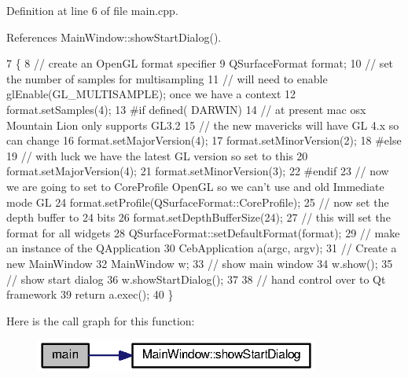 Definition at line 6 of file main.\-cpp.



References Main\-Window\-::show\-Start\-Dialog().


\begin{DoxyCode}
7 \{
8   \textcolor{comment}{// create an OpenGL format specifier}
9   QSurfaceFormat format;
10   \textcolor{comment}{// set the number of samples for multisampling}
11   \textcolor{comment}{// will need to enable glEnable(GL\_MULTISAMPLE); once we have a context}
12   format.setSamples(4);
13 \textcolor{preprocessor}{  #if defined( DARWIN)}
14 \textcolor{preprocessor}{}    \textcolor{comment}{// at present mac osx Mountain Lion only supports GL3.2}
15     \textcolor{comment}{// the new mavericks will have GL 4.x so can change}
16     format.setMajorVersion(4);
17     format.setMinorVersion(2);
18 \textcolor{preprocessor}{  #else}
19 \textcolor{preprocessor}{}    \textcolor{comment}{// with luck we have the latest GL version so set to this}
20     format.setMajorVersion(4);
21     format.setMinorVersion(3);
22 \textcolor{preprocessor}{  #endif}
23 \textcolor{preprocessor}{}  \textcolor{comment}{// now we are going to set to CoreProfile OpenGL so we can't use and old Immediate mode GL}
24   format.setProfile(QSurfaceFormat::CoreProfile);
25   \textcolor{comment}{// now set the depth buffer to 24 bits}
26   format.setDepthBufferSize(24);
27   \textcolor{comment}{// this will set the format for all widgets}
28   QSurfaceFormat::setDefaultFormat(format);
29   \textcolor{comment}{// make an instance of the QApplication}
30   CebApplication a(argc, argv);
31   \textcolor{comment}{// Create a new MainWindow}
32   MainWindow w;
33   \textcolor{comment}{// show main window}
34   w.show();
35   \textcolor{comment}{// show start dialog}
36   w.showStartDialog();
37 
38   \textcolor{comment}{// hand control over to Qt framework}
39   \textcolor{keywordflow}{return} a.exec();
40 \}
\end{DoxyCode}


Here is the call graph for this function\-:\nopagebreak
\begin{figure}[H]
\begin{center}
\leavevmode
\includegraphics[width=264pt]{main_8cpp_a3c04138a5bfe5d72780bb7e82a18e627_cgraph}
\end{center}
\end{figure}


